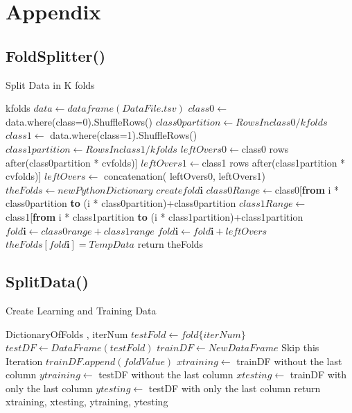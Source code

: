 \documentclass{article}
\begin{document}
\section{Appendix}
\subsection{FoldSplitter()}

\begin{algorithm}[H]
\caption{Split Data in K folds}
\begin{algorithmic}[1]
\REQUIRE kfolds  
\STATE $ data \gets dataframe(DataFile.tsv)$
\STATE $ class0 \gets $ data.where(class=0).ShuffleRows() 
\STATE $ class0partition \gets  Rows In class0 / kfolds $
\STATE $ class1 \gets $ data.where(class=1).ShuffleRows()
\STATE $ class1partition \gets  Rows In class1 / kfolds $
\STATE $ leftOvers0 \gets $class0 rows after(class0partition * cvfolds)]
\STATE $ leftOvers1 \gets $class1 rows after(class1partition * cvfolds)]
\STATE $ leftOvers \gets $ concatenation( leftOvers0, leftOvers1)
\STATE $ theFolds \gets newPythonDictionary$
        \STATE  $create fold\textbf{i} $  
      	\STATE $class0Range \gets $class0[\textbf{from} i * class0partition \textbf{to} (i * class0partition)+class0partition  
      	\STATE $class1Range \gets$ class1[\textbf{from} i * class1partition \textbf{to} (i * class1partition)+class1partition   
      	\STATE $fold\textbf{i} \gets class0range + class1range  $
	  	\STATE $fold\textbf{i} \gets fold\textbf{i} + leftOvers $ 
		\ENDIF	
    \STATE $theFolds[fold\textbf{i}] = TempData $  	
	\ENDFOR
\STATE return theFolds 
\end{algorithmic}
\end{algorithm}

 \subsection{SplitData()}
\begin{algorithm}[H]
\caption{Create Learning and Training Data}
\begin{algorithmic}[1]
\REQUIRE DictionaryOfFolds , iterNum 
\STATE $ testFold \gets fold\{iterNum\}$ 
\STATE $testDF \gets DataFrame(testFold) $
\STATE $trainDF \gets NewDataFrame $
		  	\STATE Skip this Iteration 
		\ENDIF
        \STATE $trainDF.append(foldValue)$
  	\ENDFOR
\STATE $xtraining \gets $ trainDF without the last column 
\STATE $ytraining \gets $ testDF without the last column
\STATE $xtesting \gets $ trainDF with only the last column
\STATE $ytesting \gets $ testDF with only the last column
\STATE return xtraining, xtesting, ytraining, ytesting

\end{algorithmic}
\end{algorithm}
\end{document}
